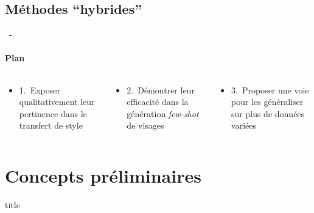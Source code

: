 \documentclass[aspectratio=169, 22pt]{beamer}
\begin{document}
\subsection{Méthodes ``hybrides''}
\begin{frame}{\secname~- \subsecname}
  \framesubtitle{Plan}
  \begin{columns}
    \begin{column}{0.3\linewidth}
      \begin{itemize}
        \centering
        \item \small 1. Exposer \alert{qualitativement} leur pertinence dans le transfert de style
      \end{itemize}
    \end{column}
    \begin{column}{0.3\linewidth}
      \begin{itemize}
        \centering
      \item \small 2. Démontrer leur \alert{efficacité} dans la génération \emph{few-shot} de visages
      \end{itemize}      
    \end{column}
    \begin{column}{0.3\linewidth}
      \begin{itemize}
        \centering
      \item \small 3. Proposer une voie pour les \alert{généraliser} sur plus de données variées
      \end{itemize}      
    \end{column}
  \end{columns}
\end{frame}


\section{Concepts préliminaires}
\begin{frame}
  \begin{beamercolorbox}[sep=15pt,center,shadow=true,rounded=true]{title}
    \LARGE\bfseries \secname
  \end{beamercolorbox}
\end{frame}
\end{document}
